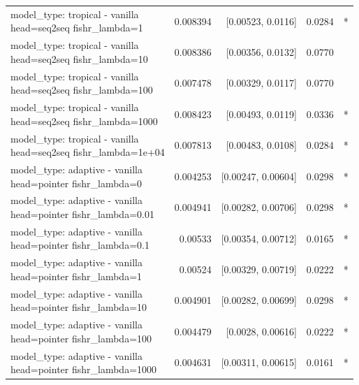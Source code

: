 \documentclass[10pt]{article}
\makeatletter
\newcommand{\stackcell}[1]{\begin{tabular}[t]{@{}l@{}}#1\end{tabular}}
\makeatother
\begin{document}
{\begin{longtable}{lrrrl}
\stackcell{model\_type: tropical - vanilla\\\footnotesize head=seq2seq fishr\_lambda=1 } & 0.008394 & [0.00523, 0.0116] & 0.0284 & *\\
\stackcell{model\_type: tropical - vanilla\\\footnotesize head=seq2seq fishr\_lambda=10 } & 0.008386 & [0.00356, 0.0132] & 0.0770 & \\
\stackcell{model\_type: tropical - vanilla\\\footnotesize head=seq2seq fishr\_lambda=100 } & 0.007478 & [0.00329, 0.0117] & 0.0770 & \\
\stackcell{model\_type: tropical - vanilla\\\footnotesize head=seq2seq fishr\_lambda=1000 } & 0.008423 & [0.00493, 0.0119] & 0.0336 & *\\
\stackcell{model\_type: tropical - vanilla\\\footnotesize head=seq2seq fishr\_lambda=1e+04 } & 0.007813 & [0.00483, 0.0108] & 0.0284 & *\\
\stackcell{model\_type: adaptive - vanilla\\\footnotesize head=pointer fishr\_lambda=0 } & 0.004253 & [0.00247, 0.00604] & 0.0298 & *\\
\stackcell{model\_type: adaptive - vanilla\\\footnotesize head=pointer fishr\_lambda=0.01 } & 0.004941 & [0.00282, 0.00706] & 0.0298 & *\\
\stackcell{model\_type: adaptive - vanilla\\\footnotesize head=pointer fishr\_lambda=0.1 } & 0.00533 & [0.00354, 0.00712] & 0.0165 & *\\
\stackcell{model\_type: adaptive - vanilla\\\footnotesize head=pointer fishr\_lambda=1 } & 0.00524 & [0.00329, 0.00719] & 0.0222 & *\\
\stackcell{model\_type: adaptive - vanilla\\\footnotesize head=pointer fishr\_lambda=10 } & 0.004901 & [0.00282, 0.00699] & 0.0298 & *\\
\stackcell{model\_type: adaptive - vanilla\\\footnotesize head=pointer fishr\_lambda=100 } & 0.004479 & [0.0028, 0.00616] & 0.0222 & *\\
\stackcell{model\_type: adaptive - vanilla\\\footnotesize head=pointer fishr\_lambda=1000 } & 0.004631 & [0.00311, 0.00615] & 0.0161 & *\\

\end{longtable}}
\end{document}
